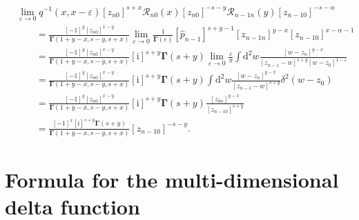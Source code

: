 \documentclass[10pt,a4paper]{amsart}
\renewcommand{\imath}{\mathrm{i}}
\numberwithin{equation}{section}
\begin{document}
\begin{align*}
&
\lim\limits_{\varepsilon\to 0}
q^{-1}(x,x-\varepsilon)
[z_{n0}]^{s+x} \mathcal{R}_{n 0}(x) [z_{n0}]^{-s-y}
\mathcal{R}_{n-1 n}(y) [z_{n-1 0}]^{-s-\alpha} \\
&\qquad =
\frac{[-1]^{y} [z_{n0}]^{x-y}}{\mathbf{\Gamma}(1+y-x,s-y,s+x)}
\lim\limits_{\varepsilon\to 0}
\frac{1}
{\mathbf{\Gamma}(\varepsilon)}
[\hat{p}_{n-1}]^{s+y-1} [z_{n-1 n}]^{y-x} [z_{n-1 0}]^{x-\alpha-1} \\
&\qquad =
\frac{[-1]^{y} [z_{n0}]^{x-y}}
{\mathbf{\Gamma}(1+y-x,s-y,s+x)}
[\imath]^{s+y} \bm{\Gamma}(s+y)
\lim\limits_{\varepsilon\to 0} \frac{\varepsilon}{\pi}
\int \mathrm{d}^2 w \frac{[w-z_{n}]^{y-x}}
{[z_{n-1}-w]^{s+y} [w-z_0]^{1-\varepsilon}} \\
&\qquad =
\frac{[-1]^{y} [z_{n0}]^{x-y}}
{\mathbf{\Gamma}(1+y-x,s-y,s+x)}
[\imath]^{s+y} \bm{\Gamma}(s+y)
\int \mathrm{d}^2 w \frac{[w-z_{n}]^{y-x}}
{[z_{n-1}-w]^{s+y}}
\delta^2(w-z_0) \\
&\qquad =
\frac{[-1]^{y} [z_{n0}]^{x-y}}
{\mathbf{\Gamma}(1+y-x,s-y,s+x)}
[\imath]^{s+y} \bm{\Gamma}(s+y) \frac{[z_{0 n}]^{y-x}}
{[z_{n-1 0}]^{s+y}} \\
&\qquad =
\frac{[-1]^{x} [\imath]^{s+y} \mathbf{\Gamma}(s+y)}
{\mathbf{\Gamma}(1+y-x,s-y,s+x)} [z_{n-1 0}]^{-s-y} .
\end{align*}

\section{Formula for the multi-dimensional delta function}
\end{document}
